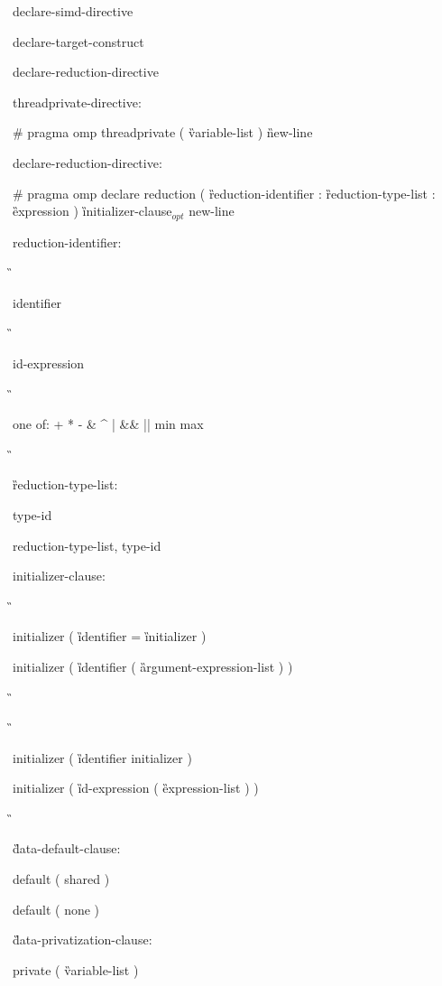 {\I declare-simd-directive

\I declare-target-construct

\I declare-reduction-directive

threadprivate-directive:

\C\I \# pragma omp threadprivate ( \G variable-list \C ) \G new-line

declare-reduction-directive:

\C\I \# pragma omp declare reduction ( \G reduction-identifier \C : \G reduction-type-list \C : \G expression \C ) \G initializer-clause$_{opt}$ new-line

reduction-identifier: 

\G\cspecificstart

\I identifier 

\G\cspecificend

\cppspecificstart

\I id-expression 

\G\cppspecificend

\ccppspecificstart

\I one of: \C + * - \& \^ { } \C | \&\& || min max 

\G\ccppspecificend

\G reduction-type-list: 

\I type-id 

\I reduction-type-list, type-id 

\begin{samepage}
initializer-clause: 

\G\cspecificstart

\C\I initializer ( \G identifier \C = \G initializer \C )

\C\I initializer ( \G identifier \C ( \G argument-expression-list \C ) ) 

\G\cspecificend
\end{samepage}

\G\cppspecificstart

\C\I initializer \C ( \G identifier initializer \C )

\I initializer \C ( \G id-expression \C ( \G expression-list \C ) ) 

\G\cppspecificend

\G data-default-clause:

\C\I default ( shared )

\I default ( none )

\G data-privatization-clause:

\C\I private ( \G variable-list \C )

}
